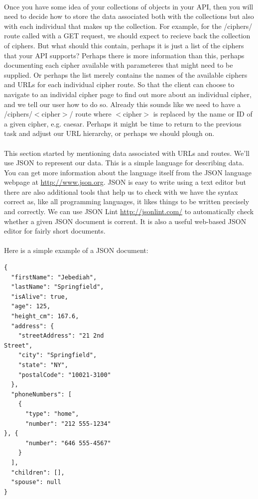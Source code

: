 \documentclass[10pt, a4paper, twosize]{article}
\begin{document}
\paragraph{} Once you have some idea of your collections of objects in your API, then you will need to decide how to store the data associated both with the collections but also with each individual that makes up the collection. For example, for the /ciphers/ route called with a GET request, we should expect to recieve back the collection of ciphers. But what should this contain, perhaps it is just a list of the ciphers that your API supports? Perhaps there is more information than this, perhaps documenting each cipher available with parameteres that might need to be supplied. Or perhaps the list merely contains the names of the available ciphers and URLs for each individual cipher route. So that the client can choose to navigate to an individal cipher page to find out more about an individual cipher, and we tell our user how to do so. Already this sounds like we need to have a /ciphers/$<$cipher$>$/ route where $<$cipher$>$ is replaced by the name or ID of a given cipher, e.g. caesar. Perhaps it might be time to return to the previous task and adjust our URL hierarchy, or perhaps we should plough on.

\paragraph{} This section started by mentioning data associated with URLs and routes. We'll use JSON to represent our data. This is a simple language for describing data. You can get more information about the language itself from the JSON language webpage at \url{http://www.json.org}. JSON is easy to write using a text editor but there are also additional tools that help us to check with we have the syntax correct as, like all programming languages, it likes things to be written precisely and correctly. We can use JSON Lint \url{http://jsonlint.com/} to automatically check whether a given JSON document is corrent. It is also a useful web-based JSON editor for fairly short documents.

\paragraph{} Here is a simple example of a JSON document:
\begin{lstlisting}
{
  "firstName": "Jebediah",
  "lastName": "Springfield",
  "isAlive": true,
  "age": 125,
  "height_cm": 167.6,
  "address": {
    "streetAddress": "21 2nd
Street",
    "city": "Springfield",
    "state": "NY",
    "postalCode": "10021-3100"
  },
  "phoneNumbers": [
    {
      "type": "home",
      "number": "212 555-1234"
}, {
      "number": "646 555-4567"
    }
  ],
  "children": [],
  "spouse": null
}
\end{lstlisting}
\end{document}
